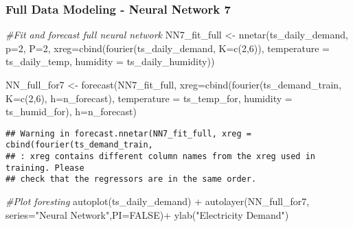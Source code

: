 \documentclass[
]{article}
\newenvironment{Shaded}{\begin{snugshade}}{\end{snugshade}}
\newcommand{\AttributeTok}[1]{\textcolor[rgb]{0.77,0.63,0.00}{#1}}
\newcommand{\CommentTok}[1]{\textcolor[rgb]{0.56,0.35,0.01}{\textit{#1}}}
\newcommand{\ConstantTok}[1]{\textcolor[rgb]{0.00,0.00,0.00}{#1}}
\newcommand{\DecValTok}[1]{\textcolor[rgb]{0.00,0.00,0.81}{#1}}
\newcommand{\FunctionTok}[1]{\textcolor[rgb]{0.00,0.00,0.00}{#1}}
\newcommand{\NormalTok}[1]{#1}
\newcommand{\OtherTok}[1]{\textcolor[rgb]{0.56,0.35,0.01}{#1}}
\newcommand{\SpecialCharTok}[1]{\textcolor[rgb]{0.00,0.00,0.00}{#1}}
\newcommand{\StringTok}[1]{\textcolor[rgb]{0.31,0.60,0.02}{#1}}
\begin{document}
\hypertarget{full-data-modeling---neural-network-7}{%
\subsubsection{Full Data Modeling - Neural Network
7}\label{full-data-modeling---neural-network-7}}

\begin{Shaded}
\begin{Highlighting}[]
\CommentTok{\#Fit and forecast full neural network}
\NormalTok{NN7\_fit\_full }\OtherTok{\textless{}{-}}  \FunctionTok{nnetar}\NormalTok{(ts\_daily\_demand,}
                 \AttributeTok{p=}\DecValTok{2}\NormalTok{,}
                 \AttributeTok{P=}\DecValTok{2}\NormalTok{,}
                 \AttributeTok{xreg=}\FunctionTok{cbind}\NormalTok{(}\FunctionTok{fourier}\NormalTok{(ts\_daily\_demand, }
                                          \AttributeTok{K=}\FunctionTok{c}\NormalTok{(}\DecValTok{2}\NormalTok{,}\DecValTok{6}\NormalTok{)),}
                            \AttributeTok{temperature =}\NormalTok{ ts\_daily\_temp,}
                            \AttributeTok{humidity =}\NormalTok{ ts\_daily\_humidity))}

\NormalTok{NN\_full\_for7 }\OtherTok{\textless{}{-}} \FunctionTok{forecast}\NormalTok{(NN7\_fit\_full, }
                   \AttributeTok{xreg=}\FunctionTok{cbind}\NormalTok{(}\FunctionTok{fourier}\NormalTok{(ts\_demand\_train, }
                                          \AttributeTok{K=}\FunctionTok{c}\NormalTok{(}\DecValTok{2}\NormalTok{,}\DecValTok{6}\NormalTok{),}
                                          \AttributeTok{h=}\NormalTok{n\_forecast),}
                                \AttributeTok{temperature =}\NormalTok{ ts\_temp\_for, }
                                \AttributeTok{humidity =}\NormalTok{ ts\_humid\_for),}
                   \AttributeTok{h=}\NormalTok{n\_forecast)}
\end{Highlighting}
\end{Shaded}

\begin{verbatim}
## Warning in forecast.nnetar(NN7_fit_full, xreg = cbind(fourier(ts_demand_train,
## : xreg contains different column names from the xreg used in training. Please
## check that the regressors are in the same order.
\end{verbatim}

\begin{Shaded}
\begin{Highlighting}[]
\CommentTok{\#Plot foresting }
\FunctionTok{autoplot}\NormalTok{(ts\_daily\_demand) }\SpecialCharTok{+}
  \FunctionTok{autolayer}\NormalTok{(NN\_full\_for7, }\AttributeTok{series=}\StringTok{"Neural Network"}\NormalTok{,}\AttributeTok{PI=}\ConstantTok{FALSE}\NormalTok{)}\SpecialCharTok{+}
  \FunctionTok{ylab}\NormalTok{(}\StringTok{"Electricity Demand"}\NormalTok{) }
\end{Highlighting}
\end{Shaded}
\end{document}
